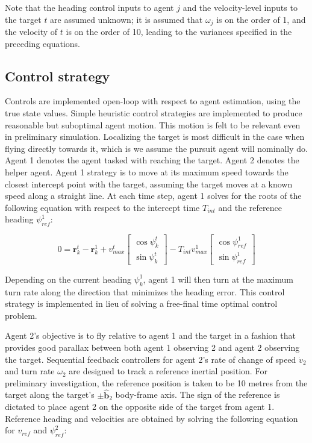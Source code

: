 \documentclass{aiaa-tc}
\newcommand{\B}[1]{\textbf{#1}} %
\newcommand{\U}[1]{\hat{\textbf{#1}}} %
\begin{document}
Note that the heading control inputs to agent $j$ and the velocity-level inputs to the target $t$ are assumed unknown; it is assumed that $\omega_j$ is on the order of 1, and the velocity of $t$ is on the order of 10, leading to the variances specified in the preceding equations.

\subsection{Control strategy}

Controls are implemented open-loop with respect to agent estimation, using the true state values. Simple heuristic control strategies are implemented to produce reasonable but suboptimal agent motion. This motion is felt to be relevant even in preliminary simulation. Localizing the target is most difficult in the case when flying directly towards it, which is we assume the pursuit agent will nominally do. Agent 1 denotes the agent tasked with reaching the target. Agent 2 denotes the helper agent. Agent 1 strategy is to move at its maximum speed towards the closest intercept point with the target, assuming the target moves at a known speed along a straight line. At each time step, agent 1 solves for the roots of the following equation with respect to the intercept time $T_{int}$ and the reference heading $\psi_{ref}^1$:

\begin{equation}
0=\B{r}^t_k - \B{r}^1_k + v^t_{max} \begin{bmatrix}
\cos{\psi^t_k}\\
\sin{\psi^t_k}
\end{bmatrix} - T_{int} v^1_{max} \begin{bmatrix}
\cos{\psi^1_{ref}}\\
\sin{\psi^1_{ref}}
\end{bmatrix}
\end{equation}

Depending on the current heading $\psi^1_k$, agent 1 will then turn at the maximum turn rate along the direction that minimizes the heading error. This control strategy is implemented in lieu of solving a free-final time optimal control problem.

Agent 2's objective is to fly relative to agent 1 and the target in a fashion that provides good parallax between both agent 1 observing 2 and agent 2 observing the target. Sequential feedback controllers for agent 2's rate of change of speed $\dot{v}_2$ and turn rate $\omega_2$ are designed to track a reference inertial position. For preliminary investigation, the reference position is taken to be 10 metres from the target along the target's $\pm \U{b}_2$ body-frame axis. The sign of the reference is dictated to place agent 2 on the opposite side of the target from agent 1. Reference heading and velocities are obtained by solving the following equation for $v_{ref}$ and $\psi^2_{ref}$:
\end{document}
